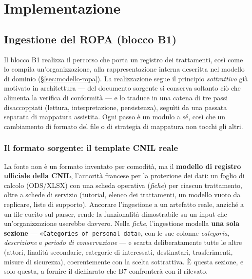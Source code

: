 \chapter{Implementazione}
\label{cap:implementazione}


\section{Ingestione del ROPA (blocco B1)}
\label{sec:impl-b1-ingestione}

Il blocco B1 realizza il percorso che porta un registro dei trattamenti, così come lo compila un'organizzazione, alla rappresentazione interna descritta nel modello di dominio (§\ref{sec:modello-ropa}). La realizzazione segue il principio \emph{sottrattivo} già motivato in architettura --- del documento sorgente si conserva soltanto ciò che alimenta la verifica di conformità --- e lo traduce in una catena di tre passi disaccoppiati (lettura, interpretazione, persistenza), seguìti da una passata separata di mappatura assistita. Ogni passo è un modulo a sé, così che un cambiamento di formato del file o di strategia di mappatura non tocchi gli altri.

\subsection{Il formato sorgente: il template CNIL reale}
\label{sub:impl-b1-formato}

La fonte non è un formato inventato per comodità, ma il \textbf{modello di registro ufficiale della CNIL}, l'autorità francese per la protezione dei dati: un foglio di calcolo (ODS/XLSX) con una scheda operativa (\emph{fiche}) per ciascun trattamento, oltre a schede di servizio (tutorial, elenco dei trattamenti, un modello vuoto da replicare, liste di supporto). Ancorare l'ingestione a un artefatto reale, anziché a un file cucito sul parser, rende la funzionalità dimostrabile su un input che un'organizzazione userebbe davvero. Nella \emph{fiche}, l'ingestione modella \textbf{una sola sezione} --- «\texttt{Categories of personal data}», con le sue colonne \emph{categoria}, \emph{descrizione} e \emph{periodo di conservazione} --- e scarta deliberatamente tutte le altre (attori, finalità secondarie, categorie di interessati, destinatari, trasferimenti, misure di sicurezza), coerentemente con la scelta sottrattiva. È questa sezione, e solo questa, a fornire il dichiarato che B7 confronterà con il rilevato.

